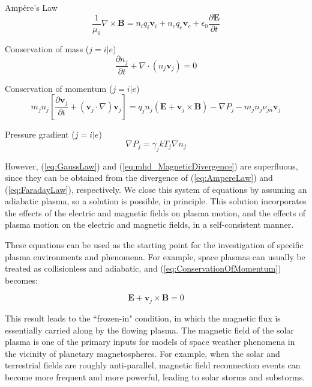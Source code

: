 \documentclass{article}
\begin{document}
Amp\`{e}re's Law
\begin{equation}
    \frac {1} {\mu_0} \nabla \times \mathbf B = n_i q_i \mathbf v_i + n_e q_e \mathbf v_e + \epsilon_0 \frac {\partial \mathbf E} {\partial t}
    \label{eq:AmpereLaw}
\end{equation}

Conservation of mass ($j = i|e$)
\begin{equation}
    \frac {\partial n_j} {\partial t} + \nabla \cdotp \left(n_j \mathbf v_j \right) = 0
    \label{eq:ConservationOfMass}
\end{equation}

Conservation of momentum ($j = i|e$)
\begin{equation}
  m_j n_j \left[ \frac {\partial \mathbf v_j} {\partial t} + \left( \mathbf v_j \cdotp \nabla \right) \mathbf v_j \right] = q_j n_j \left(\mathbf E + \mathbf v_j \times \mathbf B \right) - \nabla P_j - m_j n_j \nu_{jn} \mathbf v_j
  \label{eq:ConservationOfMomentum}
\end{equation}

Pressure gradient ($j = i|e$)
\begin{equation}
    \nabla P_j = \gamma_j k T_j \nabla n_j
    \label{eq:PressureGradient}
\end{equation}

\noindent However, (\ref{eq:GaussLaw}) and (\ref{eq:mhd_MagneticDivergence}) are superfluous, since they can be obtained from the divergence of (\ref{eq:AmpereLaw}) and (\ref{eq:FaradayLaw}), respectively. We close this system of equations by assuming an adiabatic plasma, so a solution is possible, in principle. This solution incorporates the effects of the electric and magnetic fields on plasma motion, and the effects of plasma motion on the electric and magnetic fields, in a self-consistent manner.

These equations can be used as the starting point for the investigation of specific plasma environments and phenomena. For example, space plasmas can usually be treated as collisionless and adiabatic, and (\ref{eq:ConservationOfMomentum}) becomes:

\begin{equation}
    \mathbf E + \mathbf v_j \times \mathbf B = 0
    \label{eq:IdealMHDOhmLaw}
\end{equation}

\noindent This result leads to the ``frozen-in" condition, in which the magnetic flux is essentially carried along by the flowing plasma. The magnetic field of the solar plasma is one of the primary inputs for models of space weather phenomena in the vicinity of planetary magnetospheres. For example, when the solar and terrestrial fields are roughly anti-parallel, magnetic field reconnection events can become more frequent and more powerful, leading to solar storms and substorms.
\end{document}
